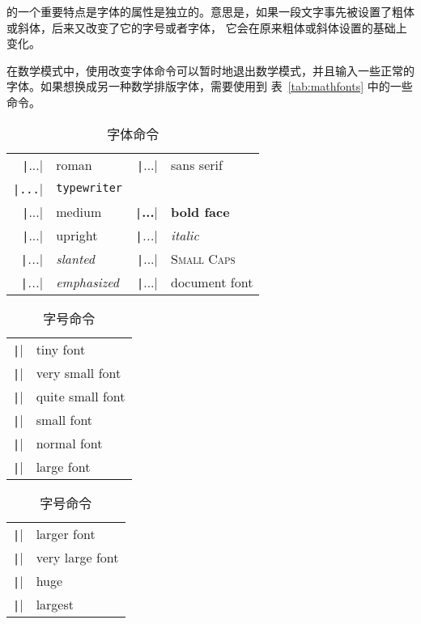 \documentclass[UTF8]{ctexart}
\begin{document}
\LaTeXe 的一个重要特点是字体的属性是独立的。意思是，如果一段文字事先被设置了粗体或斜体，后来又改变了它的字号或者字体，
它会在原来粗体或斜体设置的基础上变化。

在数学模式中，使用改变字体命令可以暂时地退出数学模式，并且输入一些正常的字体。如果想换成另一种数学排版字体，需要使用到
表~\ref{tab:mathfonts} 中的一些命令。

\begin{table}[!bp]
\centering
\caption{字体命令} \label{tab:fonts}
%
%
\begin{tabular}{@{}rl@{\qquad}rl@{}}
\texttt|\textrm{...}|        &      \textrm{roman}&
\texttt|\textsf{...}|        &      \textsf{sans serif}\\
\texttt|\texttt{...}|        &      \texttt{typewriter}\\[6pt]
\texttt|\textmd{...}|        &      \textmd{medium}&
\texttt|\textbf{...}|        &      \textbf{bold face}\\[6pt]
\texttt|\textup{...}|        &       \textup{upright}&
\texttt|\textit{...}|        &       \textit{italic}\\
\texttt|\textsl{...}|        &       \textsl{slanted}&
\texttt|\textsc{...}|        &       \textsc{Small Caps}\\[6pt]
\texttt|\emph{...}|          &            \emph{emphasized} &
\texttt|\textnormal{...}|    &    \textnormal{document} font
\end{tabular}
\end{table}

\begin{table}[!bp]
\centering
\caption{字号命令} \label{tab:sizes}
\begin{tabular}{@{}ll}
\texttt|\tiny|      & \tiny        tiny font \\
\texttt|\scriptsize|   & \scriptsize  very small font\\
\texttt|\footnotesize| & \footnotesize  quite small font \\
\texttt|\small|        &  \small            small font \\
\texttt|\normalsize|   &  \normalsize  normal font \\
\texttt|\large|        &  \large       large font
\end{tabular}%
\qquad\begin{tabular}{ll@{}}
\texttt|\Large|        &  \Large       larger font \\[5pt]
\texttt|\LARGE|        &  \LARGE       very large font \\[5pt]
\texttt|\huge|         &  \huge        huge \\[5pt]
\texttt|\Huge|         &  \Huge        largest
\end{tabular}
\end{table}
\end{document}
